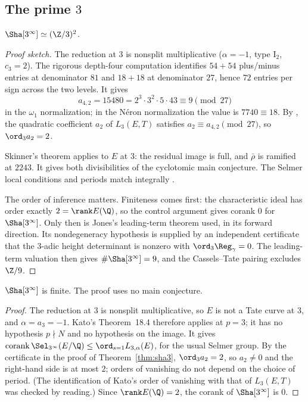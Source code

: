 \subsection[The prime 3]{The prime $3$}
\begin{theorem}\label{thm:sha3}
$\Sha[3^\infty]\simeq(\Z/3)^2$.
\end{theorem}
\begin{proof}[Proof sketch]
The reduction at $3$ is nonsplit multiplicative ($\alpha=-1$, type $\mathrm{I}_2$, $c_3=2$). The rigorous depth-four computation identifies $54+54$ plus/minus entries at denominator $81$ and $18+18$ at denominator $27$, hence $72$ entries per sign across the two levels. It gives
\[
a_{4,2}=15480=2^3\cdot3^2\cdot5\cdot43\equiv9\pmod{27}
\]
in the $\omega_1$ normalization; in the N\'eron normalization the value is $7740\equiv18$. By \cite[Prop.~3.5]{sw}, the quadratic coefficient $a_2$ of $L_3(E,T)$ satisfies $a_2\equiv a_{4,2}\pmod{27}$, so $\ord_3a_2=2$.

Skinner's theorem \cite[Thm.~A]{skinner} applies to $E$ at $3$: the residual image is full, and $\bar\rho$ is ramified at $2243$. It gives both divisibilities of the cyclotomic main conjecture. The Selmer local conditions and periods match integrally \cite{gv}.

The order of inference matters. Finiteness comes first: the characteristic ideal has order exactly $2=\rank E(\Q)$, so the control argument gives corank $0$ for $\Sha[3^\infty]$. Only then is Jones's leading-term theorem \cite[Thm.~3.1]{jones} used, in its forward direction. Its nondegeneracy hypothesis is supplied by an independent certificate that the $3$-adic height determinant is nonzero with $\ord_3\Reg_\gamma=0$. The leading-term valuation then gives $\#\Sha[3^\infty]=9$, and the Cassels--Tate pairing excludes $\Z/9$.
\end{proof}

\begin{theorem}\label{thm:sha3fin}
$\Sha[3^\infty]$ is finite. The proof uses no main conjecture.
\end{theorem}
\begin{proof}
The reduction at $3$ is nonsplit multiplicative, so $E$ is not a Tate curve at $3$, and $\alpha=a_3=-1$. Kato's Theorem~18.4 \cite{kato} therefore applies at $p=3$; it has no hypothesis $p\nmid N$ and no hypothesis on the image. It gives $\operatorname{corank}\Sel_{3^\infty}(E/\Q)\le\ord_{s=1}L_{3,\alpha}(E)$, for the usual Selmer group. By the certificate in the proof of Theorem~\ref{thm:sha3}, $\ord_3a_2=2$, so $a_2\ne0$ and the right-hand side is at most $2$; orders of vanishing do not depend on the choice of period. (The identification of Kato's order of vanishing with that of $L_3(E,T)$ was checked by reading.) Since $\rank E(\Q)=2$, the corank of $\Sha[3^\infty]$ is $0$.
\end{proof}

